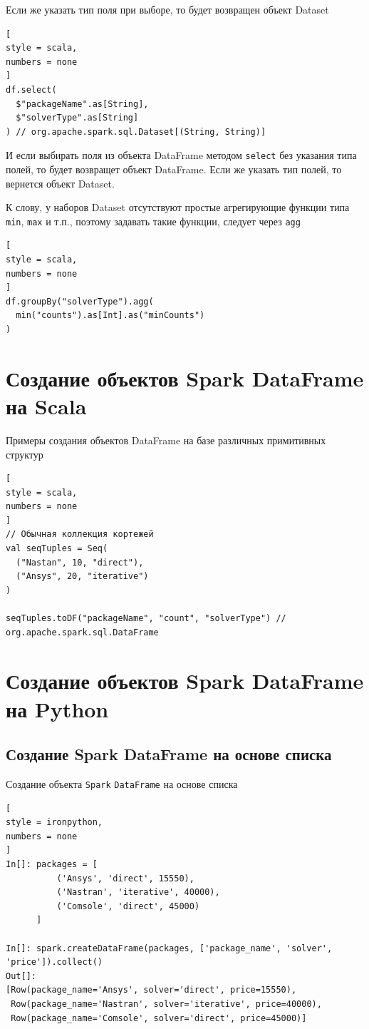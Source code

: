 \documentclass[%
	11pt,
	a4paper,
	utf8,
		]{article}
\begin{document}
Если же указать тип поля при выборе, то будет возвращен объект Dataset
\begin{lstlisting}[
style = scala,
numbers = none	
]
df.select(
  $"packageName".as[String],
  $"solverType".as[String]
) // org.apache.spark.sql.Dataset[(String, String)]
\end{lstlisting}

И если выбирать поля из объекта DataFrame методом \texttt{select} без указания типа полей, то будет возвращет объект DataFrame. Если же указать тип полей, то вернется объект Dataset.

К слову, у наборов Dataset отсутствуют простые агрегирующие функции типа \texttt{min}, \texttt{max} и т.п., поэтому задавать такие функции, следует через \texttt{agg}
\begin{lstlisting}[
style = scala,
numbers = none	
]
df.groupBy("solverType").agg(
  min("counts").as[Int].as("minCounts")
)
\end{lstlisting}


\section{Создание объектов Spark DataFrame на Scala}

Примеры создания объектов DataFrame на базе различных примитивных структур
\begin{lstlisting}[
style = scala,
numbers = none	
]
// Обычная коллекция кортежей
val seqTuples = Seq(
  ("Nastan", 10, "direct"),
  ("Ansys", 20, "iterative")
)

seqTuples.toDF("packageName", "count", "solverType") // org.apache.spark.sql.DataFrame
\end{lstlisting}


\section{Создание объектов Spark DataFrame на Python}

\subsection{Создание Spark DataFrame на основе списка}

Создание объекта \texttt{Spark} \texttt{DataFrame} на основе списка

\begin{lstlisting}[
style = ironpython,
numbers = none
]
In[]: packages = [
          ('Ansys', 'direct', 15550),
          ('Nastran', 'iterative', 40000),
          ('Comsole', 'direct', 45000)
      ]

In[]: spark.createDataFrame(packages, ['package_name', 'solver', 'price']).collect()
Out[]:
[Row(package_name='Ansys', solver='direct', price=15550),
 Row(package_name='Nastran', solver='iterative', price=40000),
 Row(package_name='Comsole', solver='direct', price=45000)]
\end{lstlisting}
\end{document}
